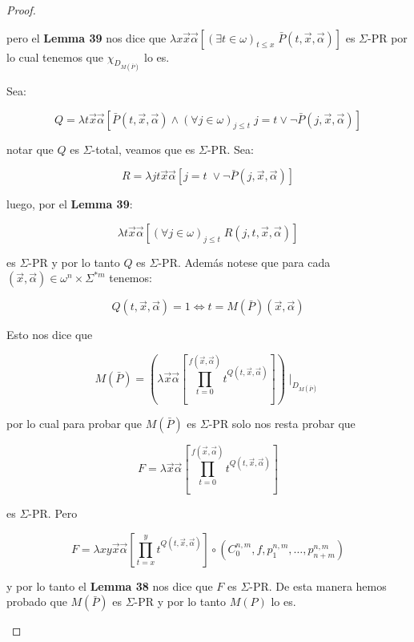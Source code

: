 \begin{proof}
\begin{enumerate}[a)]
        \PN pero el \textbf{Lemma 39} nos dice que $\lambda x\vec{x}\vec{\alpha} \left[(\exists t \in \omega)_{t\leq x}
        \; \bar{P}(t,\vec{x},\vec{\alpha})\right]$ es $\Sigma$-PR por lo cual tenemos que $\chi_{D_{M(\bar{P})}}$ lo es.

        \PN Sea:

        \[
          Q = \lambda t\vec{x}\vec{\alpha}\left[\bar{P}(t,\vec{x},\vec{\alpha}) \wedge (\forall j \in \omega)_{j \leq t}
          \; j=t \vee \lnot \bar{P}(j,\vec{x},\vec{\alpha})\right]
        \]

        \PN notar que $Q$ es $\Sigma$-total, veamos que es $\Sigma$-PR. Sea:

        \[
          R = \lambda jt\vec{x}\vec{\alpha} \left[j=t \; \vee \neg \bar{P}(j,\vec{x},\vec{\alpha})\right]
        \]

        \PN luego, por el \textbf{Lemma 39}:

        \[
          \lambda t\vec{x}\vec{\alpha} \left[(\forall j \in \omega)_{j \leq t} \; R(j,t,\vec{x},\vec{\alpha})\right]
        \]

        \PN es $\Sigma$-PR y por lo tanto $Q$ es $\Sigma$-PR. Además notese que para cada $(\vec{x},\vec{\alpha}) \in
        \omega^{n} \times \Sigma^{\ast m}$ tenemos:

        \[
          Q(t,\vec{x},\vec{\alpha}) = 1 \Leftrightarrow t = M(\bar{P})(\vec{x},\vec{\alpha})
        \]

        \PN Esto nos dice que

        \[
          M(\bar{P}) = \left(\lambda \vec{x}\vec{\alpha}\left[\prod_{t=0}^{f(\vec{x},\vec{\alpha})}t^{Q(t,\vec{x},
          \vec{\alpha})}\right]\right) \mid_{D_{M(\bar{P})}}
        \]

        \PN por lo cual para probar que $M(\bar{P})$ es $\Sigma$-PR solo nos resta probar que

        \[
          F = \lambda \vec{x}\vec{\alpha}\left[\prod_{t=0}^{f(\vec{x},\vec{\alpha})}t^{Q(t,\vec{x},\vec{\alpha})}
          \right]
        \]

        \PN es $\Sigma$-PR. Pero

        \[
          F = \lambda xy\vec{x}\vec{\alpha}\left[\prod_{t=x}^{y}t^{Q(t,\vec{x},\vec{\alpha})}\right] \circ
          (C_{0}^{n,m},f,p_{1}^{n,m},\dotsc,p_{n+m}^{n,m})
        \]

        \PN y por lo tanto el \textbf{Lemma 38} nos dice que $F$ es $\Sigma$-PR. De esta manera hemos probado que
        $M(\bar{P})$ es $\Sigma$-PR y por lo tanto $M(P)$ lo es.
    \end{enumerate}
  \end{proof}

